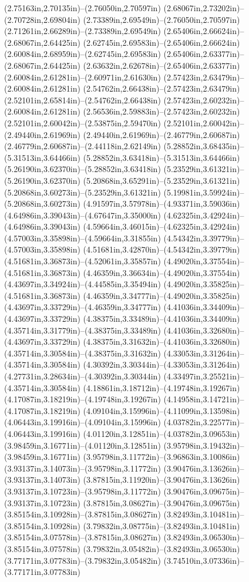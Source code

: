 (2.75163in,2.70135in)--(2.76050in,2.70597in) (2.68067in,2.73202in)--(2.70728in,2.69804in) (2.73389in,2.69549in)--(2.76050in,2.70597in) (2.71261in,2.66289in)--(2.73389in,2.69549in) (2.65406in,2.66624in)--(2.68067in,2.64425in) (2.62745in,2.69583in)--(2.65406in,2.66624in) (2.60084in,2.68959in)--(2.62745in,2.69583in) (2.65406in,2.63377in)--(2.68067in,2.64425in) (2.63632in,2.62678in)--(2.65406in,2.63377in) (2.60084in,2.61281in)--(2.60971in,2.61630in) (2.57423in,2.63479in)--(2.60084in,2.61281in) (2.54762in,2.66438in)--(2.57423in,2.63479in) (2.52101in,2.65814in)--(2.54762in,2.66438in) (2.57423in,2.60232in)--(2.60084in,2.61281in) (2.56536in,2.59883in)--(2.57423in,2.60232in) (2.52101in,2.60042in)--(2.53875in,2.59470in) (2.52101in,2.60042in)--(2.49440in,2.61969in) (2.49440in,2.61969in)--(2.46779in,2.60687in) (2.46779in,2.60687in)--(2.44118in,2.62149in) (5.28852in,3.68435in)--(5.31513in,3.64466in) (5.28852in,3.63418in)--(5.31513in,3.64466in) (5.26190in,3.62370in)--(5.28852in,3.63418in) (5.23529in,3.61321in)--(5.26190in,3.62370in) (5.20868in,3.65291in)--(5.23529in,3.61321in) (5.20868in,3.60273in)--(5.23529in,3.61321in) (5.19981in,3.59924in)--(5.20868in,3.60273in) (4.91597in,3.57978in)--(4.93371in,3.59036in) (4.64986in,3.39043in)--(4.67647in,3.35000in) (4.62325in,3.42924in)--(4.64986in,3.39043in) (4.59664in,3.46015in)--(4.62325in,3.42924in) (4.57003in,3.35898in)--(4.59664in,3.31855in) (4.54342in,3.39779in)--(4.57003in,3.35898in) (4.51681in,3.42870in)--(4.54342in,3.39779in) (4.51681in,3.36873in)--(4.52061in,3.35857in) (4.49020in,3.37554in)--(4.51681in,3.36873in) (4.46359in,3.36634in)--(4.49020in,3.37554in) (4.43697in,3.34924in)--(4.44585in,3.35494in) (4.49020in,3.35825in)--(4.51681in,3.36873in) (4.46359in,3.34777in)--(4.49020in,3.35825in) (4.43697in,3.33729in)--(4.46359in,3.34777in) (4.41036in,3.34409in)--(4.43697in,3.33729in) (4.38375in,3.33489in)--(4.41036in,3.34409in) (4.35714in,3.31779in)--(4.38375in,3.33489in) (4.41036in,3.32680in)--(4.43697in,3.33729in) (4.38375in,3.31632in)--(4.41036in,3.32680in) (4.35714in,3.30584in)--(4.38375in,3.31632in) (4.33053in,3.31264in)--(4.35714in,3.30584in) (4.30392in,3.30344in)--(4.33053in,3.31264in) (4.27731in,3.28634in)--(4.30392in,3.30344in) (4.33497in,3.25521in)--(4.35714in,3.30584in) (4.18861in,3.18712in)--(4.19748in,3.19267in) (4.17087in,3.18219in)--(4.19748in,3.19267in) (4.14958in,3.14721in)--(4.17087in,3.18219in) (4.09104in,3.15996in)--(4.11099in,3.13598in) (4.06443in,3.19916in)--(4.09104in,3.15996in) (4.03782in,3.22577in)--(4.06443in,3.19916in) (4.01120in,3.12851in)--(4.03782in,3.09653in) (3.98459in,3.16771in)--(4.01120in,3.12851in) (3.95798in,3.19432in)--(3.98459in,3.16771in) (3.95798in,3.11772in)--(3.96863in,3.10086in) (3.93137in,3.14073in)--(3.95798in,3.11772in) (3.90476in,3.13626in)--(3.93137in,3.14073in) (3.87815in,3.11920in)--(3.90476in,3.13626in) (3.93137in,3.10723in)--(3.95798in,3.11772in) (3.90476in,3.09675in)--(3.93137in,3.10723in) (3.87815in,3.08627in)--(3.90476in,3.09675in) (3.85154in,3.10928in)--(3.87815in,3.08627in) (3.82493in,3.10481in)--(3.85154in,3.10928in) (3.79832in,3.08775in)--(3.82493in,3.10481in) (3.85154in,3.07578in)--(3.87815in,3.08627in) (3.82493in,3.06530in)--(3.85154in,3.07578in) (3.79832in,3.05482in)--(3.82493in,3.06530in) (3.77171in,3.07783in)--(3.79832in,3.05482in) (3.74510in,3.07336in)--(3.77171in,3.07783in) 